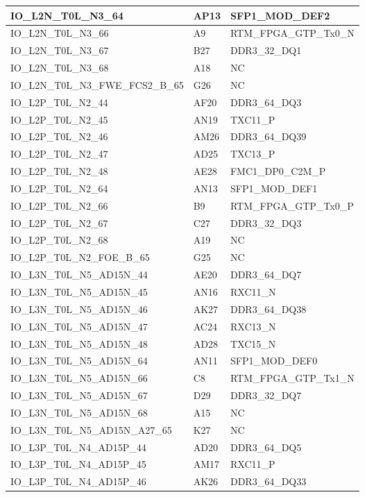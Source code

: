 \begin{footnotesize}
\begin{longtable}{|p{7cm}|p{1cm}|p{5cm}|}
IO\_L2N\_T0L\_N3\_64	&	AP13	&	SFP1\_MOD\_DEF2	\\ \hline
IO\_L2N\_T0L\_N3\_66	&	A9	&	RTM\_FPGA\_GTP\_Tx0\_N	\\ \hline
IO\_L2N\_T0L\_N3\_67	&	B27	&	DDR3\_32\_DQ1	\\ \hline
IO\_L2N\_T0L\_N3\_68	&	A18	&	NC	\\ \hline
IO\_L2N\_T0L\_N3\_FWE\_FCS2\_B\_65	&	G26	&	NC	\\ \hline
IO\_L2P\_T0L\_N2\_44	&	AF20	&	DDR3\_64\_DQ3	\\ \hline
IO\_L2P\_T0L\_N2\_45	&	AN19	&	TXC11\_P	\\ \hline
IO\_L2P\_T0L\_N2\_46	&	AM26	&	DDR3\_64\_DQ39	\\ \hline
IO\_L2P\_T0L\_N2\_47	&	AD25	&	TXC13\_P	\\ \hline
IO\_L2P\_T0L\_N2\_48	&	AE28	&	FMC1\_DP0\_C2M\_P	\\ \hline
IO\_L2P\_T0L\_N2\_64	&	AN13	&	SFP1\_MOD\_DEF1	\\ \hline
IO\_L2P\_T0L\_N2\_66	&	B9	&	RTM\_FPGA\_GTP\_Tx0\_P	\\ \hline
IO\_L2P\_T0L\_N2\_67	&	C27	&	DDR3\_32\_DQ3	\\ \hline
IO\_L2P\_T0L\_N2\_68	&	A19	&	NC	\\ \hline
IO\_L2P\_T0L\_N2\_FOE\_B\_65	&	G25	&	NC	\\ \hline
IO\_L3N\_T0L\_N5\_AD15N\_44	&	AE20	&	DDR3\_64\_DQ7	\\ \hline
IO\_L3N\_T0L\_N5\_AD15N\_45	&	AN16	&	RXC11\_N	\\ \hline
IO\_L3N\_T0L\_N5\_AD15N\_46	&	AK27	&	DDR3\_64\_DQ38	\\ \hline
IO\_L3N\_T0L\_N5\_AD15N\_47	&	AC24	&	RXC13\_N	\\ \hline
IO\_L3N\_T0L\_N5\_AD15N\_48	&	AD28	&	TXC15\_N	\\ \hline
IO\_L3N\_T0L\_N5\_AD15N\_64	&	AN11	&	SFP1\_MOD\_DEF0	\\ \hline
IO\_L3N\_T0L\_N5\_AD15N\_66	&	C8	&	RTM\_FPGA\_GTP\_Tx1\_N	\\ \hline
IO\_L3N\_T0L\_N5\_AD15N\_67	&	D29	&	DDR3\_32\_DQ7	\\ \hline
IO\_L3N\_T0L\_N5\_AD15N\_68	&	A15	&	NC	\\ \hline
IO\_L3N\_T0L\_N5\_AD15N\_A27\_65	&	K27	&	NC	\\ \hline
IO\_L3P\_T0L\_N4\_AD15P\_44	&	AD20	&	DDR3\_64\_DQ5	\\ \hline
IO\_L3P\_T0L\_N4\_AD15P\_45	&	AM17	&	RXC11\_P	\\ \hline
IO\_L3P\_T0L\_N4\_AD15P\_46	&	AK26	&	DDR3\_64\_DQ33	\\ \hline

\end{longtable}
\end{footnotesize}
